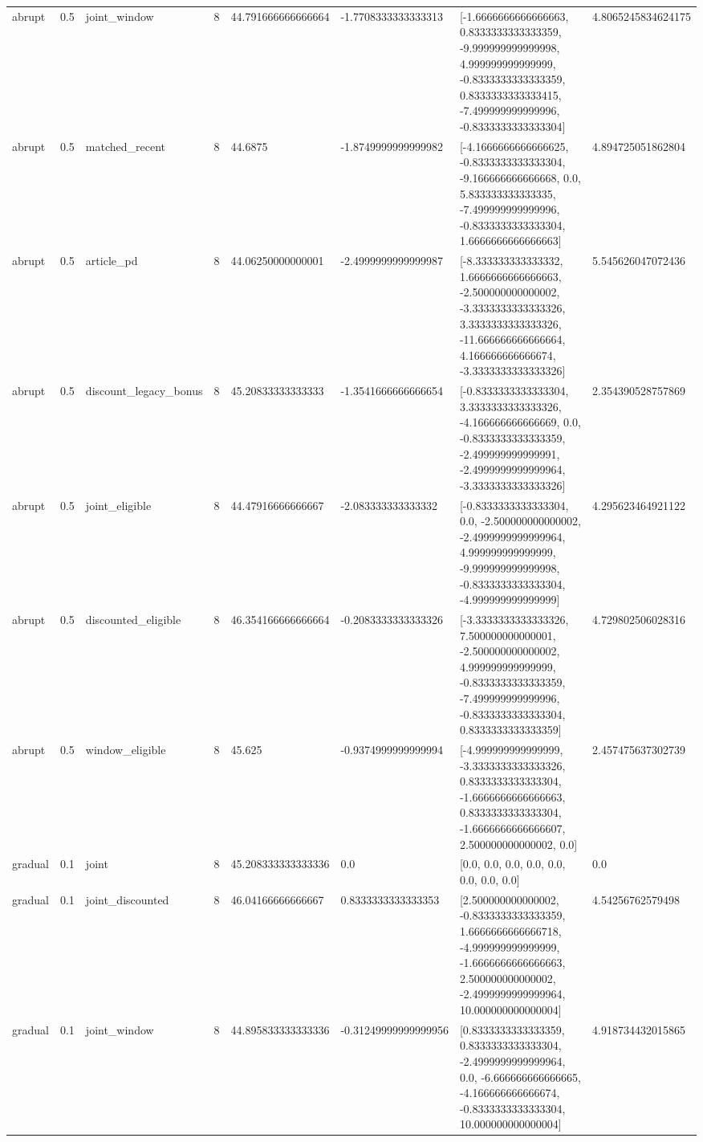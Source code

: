 \begin{tabular}{llllllll}
abrupt & 0.5 & joint\_window & 8 & 44.791666666666664 & -1.7708333333333313 & [-1.6666666666666663, 0.8333333333333359, -9.999999999999998, 4.999999999999999, -0.8333333333333359, 0.8333333333333415, -7.499999999999996, -0.8333333333333304] & 4.8065245834624175 \\
abrupt & 0.5 & matched\_recent & 8 & 44.6875 & -1.8749999999999982 & [-4.1666666666666625, -0.8333333333333304, -9.166666666666668, 0.0, 5.833333333333335, -7.499999999999996, -0.8333333333333304, 1.6666666666666663] & 4.894725051862804 \\
abrupt & 0.5 & article\_pd & 8 & 44.06250000000001 & -2.4999999999999987 & [-8.333333333333332, 1.6666666666666663, -2.500000000000002, -3.3333333333333326, 3.3333333333333326, -11.666666666666664, 4.166666666666674, -3.3333333333333326] & 5.545626047072436 \\
abrupt & 0.5 & discount\_legacy\_bonus & 8 & 45.20833333333333 & -1.3541666666666654 & [-0.8333333333333304, 3.3333333333333326, -4.166666666666669, 0.0, -0.8333333333333359, -2.499999999999991, -2.4999999999999964, -3.3333333333333326] & 2.354390528757869 \\
abrupt & 0.5 & joint\_eligible & 8 & 44.47916666666667 & -2.083333333333332 & [-0.8333333333333304, 0.0, -2.500000000000002, -2.4999999999999964, 4.999999999999999, -9.999999999999998, -0.8333333333333304, -4.999999999999999] & 4.295623464921122 \\
abrupt & 0.5 & discounted\_eligible & 8 & 46.354166666666664 & -0.2083333333333326 & [-3.3333333333333326, 7.500000000000001, -2.500000000000002, 4.999999999999999, -0.8333333333333359, -7.499999999999996, -0.8333333333333304, 0.8333333333333359] & 4.729802506028316 \\
abrupt & 0.5 & window\_eligible & 8 & 45.625 & -0.9374999999999994 & [-4.999999999999999, -3.3333333333333326, 0.8333333333333304, -1.6666666666666663, 0.8333333333333304, -1.6666666666666607, 2.500000000000002, 0.0] & 2.457475637302739 \\
gradual & 0.1 & joint & 8 & 45.208333333333336 & 0.0 & [0.0, 0.0, 0.0, 0.0, 0.0, 0.0, 0.0, 0.0] & 0.0 \\
gradual & 0.1 & joint\_discounted & 8 & 46.04166666666667 & 0.8333333333333353 & [2.500000000000002, -0.8333333333333359, 1.6666666666666718, -4.999999999999999, -1.6666666666666663, 2.500000000000002, -2.4999999999999964, 10.000000000000004] & 4.54256762579498 \\
gradual & 0.1 & joint\_window & 8 & 44.895833333333336 & -0.31249999999999956 & [0.8333333333333359, 0.8333333333333304, -2.4999999999999964, 0.0, -6.666666666666665, -4.166666666666674, -0.8333333333333304, 10.000000000000004] & 4.918734432015865 \\

\end{tabular}
